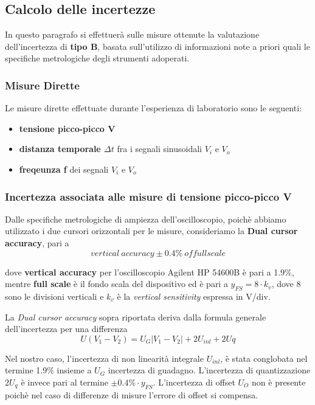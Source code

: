 \clearpage

\subsection{Calcolo delle incertezze}
In questo paragrafo si effettuerà sulle misure ottenute la valutazione dell'incertezza di \textbf{tipo B}, basata sull'utilizzo di informazioni note a priori quali le specifiche metrologiche degli strumenti adoperati.

\subsubsection{Misure Dirette}

Le misure dirette effettuate durante l'esperienza di laboratorio sono le seguenti:
\begin{itemize}
    \item \textbf{tensione picco-picco V}
    \item \textbf{distanza temporale $\Delta t$}  fra i segnali sinusoidali $V_i$ e $V_o$
    \item \textbf{freqeunza f} dei segnali $V_i$ e $V_o$ 
\end{itemize}


\subsubsection*{Incertezza associata alle misure di tensione picco-picco V}

Dalle specifiche metrologiche di ampiezza dell'oscilloscopio, poichè abbiamo utilizzato i due cursori orizzontali per le misure, consideriamo la \textbf{Dual cursor accuracy}, pari a 
\[vertical \ accuracy \pm 0.4\% \ of full scale\]

dove \textbf{vertical accuracy} per l'oscilloscopio Agilent HP 54600B è pari a 1.9\%, mentre \textbf{full scale} è il fondo scala del dispositivo ed è pari a $y_{FS} = 8 \cdot k_v$, dove 8 sono le divisioni verticali e $k_v$ è la \emph{vertical sensitivity} espressa in V/div.

La \emph{Dual cursor accuracy} sopra riportata deriva dalla formula generale dell'incertezza per una differenza 
\[U(V_1 - V_2) = U_G|V_1 - V_2| + 2U_{inl} + 2U{q}\]

Nel nostro caso, l'incertezza di non linearità integrale $U_{inl}$, è stata conglobata nel termine 1.9\% insieme a $U_G$ incertezza di guadagno. L'incertezza di quantizzazione $2U_q$ è invece pari al termine $\pm 0.4\% \cdot y_{FS}$. L'incertezza di offset $U_O$ non è presente poichè nel caso di differenze di misure l'errore di offset si compensa.


